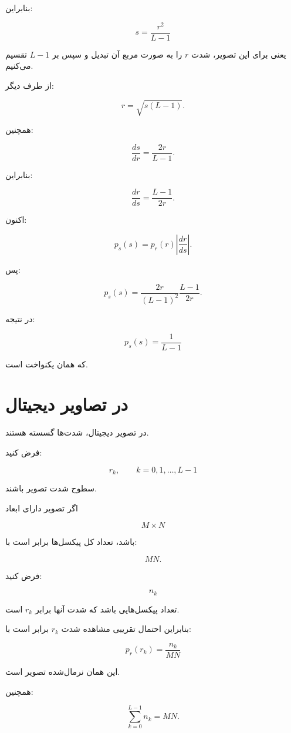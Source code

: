\documentclass[12pt,a4paper]{article}
\begin{document}
	بنابراین:
	
	\[
	\boxed{
		s=\frac{r^2}{L-1}
	}
	\tag{9}
	\]
	
	یعنی برای  این تصویر، شدت $r$ را به صورت مربع آن
	تبدیل و سپس بر $L-1$ تقسیم می‌کنیم.
	
	از طرف دیگر:
	
	\[
	r=\sqrt{s(L-1)}.
	\]
	
	همچنین:
	
	\[
	\frac{ds}{dr}
	=
	\frac{2r}{L-1}.
	\]
	
	بنابراین:
	
	\[
	\frac{dr}{ds}
	=
	\frac{L-1}{2r}.
	\]
	
	اکنون:
	
	\[
	p_s(s)
	=
	p_r(r)
	\left|\frac{dr}{ds}\right|.
	\]
	
	پس:
	
	\[
	p_s(s)
	=
	\frac{2r}{(L-1)^2}
	\frac{L-1}{2r}.
	\]
	
	در نتیجه:
	
	\[
	\boxed{
		p_s(s)=\frac{1}{L-1}
	}
	\]
	
	که همان  یکنواخت است.
	
	
	\section{ در تصاویر دیجیتال}
	
	در تصویر دیجیتال، شدت‌ها گسسته هستند.
	
	فرض کنید:
	
	\[
	r_k,\qquad k=0,1,\ldots,L-1
	\]
	
	سطوح شدت تصویر باشند.
	
	اگر تصویر دارای ابعاد
	
	\[
	M\times N
	\]
	
	باشد، تعداد کل پیکسل‌ها برابر است با:
	
	\[
	MN.
	\]
	
	فرض کنید:
	
	\[
	n_k
	\]
	
	تعداد پیکسل‌هایی باشد که شدت آنها برابر $r_k$ است.
	
	بنابراین احتمال تقریبی مشاهده شدت $r_k$ برابر است با:
	
	\[
	\boxed{
		p_r(r_k)
		=
		\frac{n_k}{MN}
	}
	\tag{10}
	\]
	
	این همان  نرمال‌شده تصویر است.
	
	همچنین:
	
	\[
	\sum_{k=0}^{L-1}n_k=MN.
	\]
	
\end{document}
